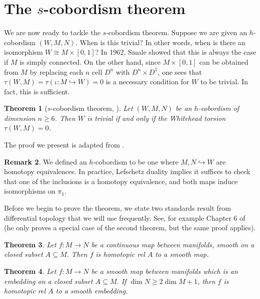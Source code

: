 \documentclass[a4paper, 12pt]{article}
\newtheorem{thm}{Theorem}[section]
\theoremstyle{definition}
\newtheorem{remark}[thm]{Remark}
\begin{document}
\section{The \texorpdfstring{$s$}{s}-cobordism theorem}\label{sec:s-cobordism}
We are now ready to tackle the $s$-cobordism theorem. Suppose we are given an $h$-cobordism $(W, M, N)$. When is this trivial? In other words, when is there an isomorphism $W \cong M \times [0, 1]$? In 1962, Smale \cite{smale-h-cobordism} showed that this is always the case if $M$ is simply connected. On the other hand, since $M \times [0, 1]$ can be obtained from $M$ by replacing each $n$ cell $D^n$ with $D^n \times D^1$, one sees that $\tau(W, M) = \tau(\iota: M \hookrightarrow W) = 0$ is a necessary condition for $W$ to be trivial. In fact, this is sufficient.

\begin{thm}[$s$-cobordism theorem, \cite{mazur-s-cobordism} \cite{stallings-s-cobordism}]
  Let $(W, M, N)$ be an $h$-cobordism of dimension $n \geq 6$. Then $W$ is trivial if and only if the Whitehead torsion $\tau(W, M) = 0$.
\end{thm}
The proof we present is adapted from \cite{luck-surgery}.

\begin{remark}
  We defined an $h$-cobordism to be one where $M, N \hookrightarrow W$ are homotopy equivalences. In practice, Lefschetz duality implies it suffices to check that one of the inclusions is a homotopy equivalence, and both maps induce isomorphisms on $\pi_1$.
\end{remark}

Before we begin to prove the theorem, we state two standards result from differential topology that we will use frequently. See, for example Chapter 6 of \cite{lee-smooth-manifolds} (he only proves a special case of the second theorem, but the same proof applies).
\begin{thm}
  Let $f: M \to N$ be a continuous map between manifolds, smooth on a closed subset $A \subseteq M$. Then $f$ is homotopic rel $A$ to a smooth map. 
\end{thm}

\begin{thm}
  Let $f: M \to N$ be a smooth map between manifolds which is an embedding on a closed subset $A \subseteq M$. If $\dim N \geq 2 \dim M + 1$, then $f$ is homotopic rel $A$ to a smooth embedding.
\end{thm}
\end{document}
